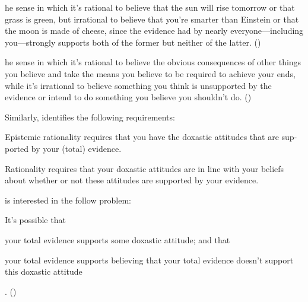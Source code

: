 \documentclass[10pt]{article}
\begin{document}
\begin{description}[font=\bfseries, leftmargin=.75cm, style=nextline]
\item[Substantive rationality] [T]he sense in which it's rational to believe that the sun will rise tomorrow or that grass is green, but irrational to believe that you're smarter than Einstein or that the moon is made of cheese, since the evidence had by nearly everyone—including you—strongly supports both of the former but neither of the latter.\nolinebreak
  \mbox{}\hfill\mbox{(\citeyear[1]{Fogal:2019aa})}
\item[Structural rationality] [T]he sense in which it's rational to believe the obvious consequences of other things you believe and take the means you believe to be required to achieve your ends, while it's irrational to believe something you think is unsupported by the evidence or intend to do something you believe you shouldn't do.\nolinebreak
  \mbox{}\hfill\mbox{(\citeyear[2]{Fogal:2019aa})}
\end{description}

Similarly, \textcite[1]{Knoks:2020aa} identifies the following requirements:

\begin{description}[font=\bfseries, leftmargin=.75cm, style=nextline]
\item[Evidential Requirement] Epistemic rationality requires that you have the doxastic attitudes that are sup- ported by your (total) evidence.
\item[Inter-level Coherence Requirement] Rationality requires that your doxastic attitudes are in line with your beliefs about whether or not these attitudes are supported by your evidence.
\end{description}

\citeauthor{Knoks:2020aa} is interested in the follow problem:

\begin{description}[font=\bfseries, leftmargin=.75cm, style=nextline]
\item[Misleading total evidence]
  It's possible that
  \begin{enumerate*}[label=(\arabic*)]
  \item your total evidence supports some doxastic attitude; and that
  \item your total evidence supports believing that your total evidence doesn't support this doxastic attitude
  \end{enumerate*}
  .\nolinebreak
  \mbox{}\hfill\mbox{(\citeyear[2]{Knoks:2020aa})}
\end{description}
\end{document}
